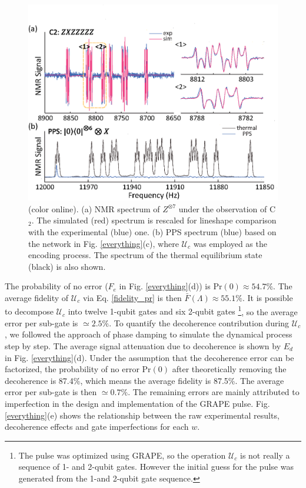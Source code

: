 \documentclass[prl,twocolumn,showpacs,superscriptaddress]{revtex4-1}
\begin{document}
\begin{figure}[htb]
\begin{center}
\includegraphics[width=\columnwidth]{spectra.eps}
\end{center}
\setlength{\abovecaptionskip}{-0.35cm}
\caption{\footnotesize{(color online). (a) NMR spectrum of $Z^{\otimes 7}$ under the observation of C$_2$. The simulated (red) spectrum is rescaled for lineshape comparison with the experimental (blue) one. (b) PPS spectrum (blue) based on the network in Fig. \ref{everything}(c), where $\mathcal{U}_{c}$ was employed as the encoding process. The spectrum of the thermal equilibrium state (black) is also shown.}}\label{spectra}
\end{figure}

 The probability of no error ($F_e$ in Fig. \ref{everything}(d)) is $\text{Pr}(0)\approx54.7\%$. The average fidelity of $\mathcal{U}_{c}$ via Eq. \eqref{fidelity_pr} is then $\bar{F}(\Lambda)\approx55.1\%$. {It is possible to decompose    $\mathcal{U}_{c}$ into  twelve 1-qubit gates and six 2-qubit gates \footnote{{The pulse was optimized using GRAPE, so the operation $\mathcal{U}_{c}$ is not really a sequence of 1- and 2-qubit  gates. However the initial guess for the pulse was generated from the 1-and 2-qubit gate sequence.}}}, so the average error per sub-gate is  $\simeq 2.5\%$. To quantify the decoherence contribution during $\mathcal{U}_{c}$, we followed the approach of phase damping \cite{Vandersypen2001} to simulate the dynamical process step by step. The average signal attenuation due to decoherence is shown by $E_d$ in Fig. \ref{everything}(d). Under the assumption that the decoherence error can be factorized,  the probability of no error $\text{Pr}(0)$ after theoretically removing the decoherence is 87.4\%, which means the average fidelity is 87.5\%. The average error  per sub-gate is  then $\simeq 0.7\%$. The remaining  errors are  mainly attributed to imperfection in the design and implementation of the GRAPE pulse.  Fig. \ref{everything}(e) shows  the relationship between the raw experimental results, decoherence effects and gate imperfections for each $w$.
\end{document}
